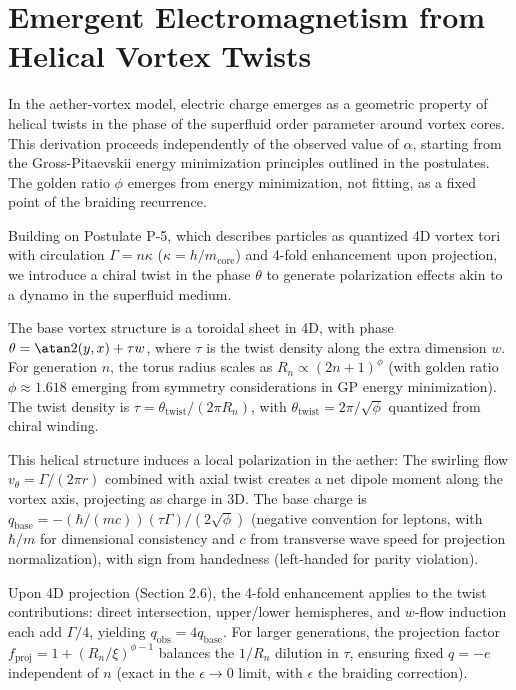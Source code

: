 \section{Emergent Electromagnetism from Helical Vortex Twists}

In the aether-vortex model, electric charge emerges as a geometric property of helical twists in the phase of the superfluid order parameter around vortex cores. This derivation proceeds independently of the observed value of $\alpha$, starting from the Gross-Pitaevskii energy minimization principles outlined in the postulates. The golden ratio $\phi$ emerges from energy minimization, not fitting, as a fixed point of the braiding recurrence.

Building on Postulate P-5, which describes particles as quantized 4D vortex tori with circulation $\Gamma = n \kappa$ ($\kappa = h / m_{\text{core}}$) and 4-fold enhancement upon projection, we introduce a chiral twist in the phase $\theta$ to generate polarization effects akin to a dynamo in the superfluid medium.

The base vortex structure is a toroidal sheet in 4D, with phase $\theta = \atan2(y, x) + \tau w$, where $\tau$ is the twist density along the extra dimension $w$. For generation $n$, the torus radius scales as $R_n \propto (2n+1)^\phi$ (with golden ratio $\phi \approx 1.618$ emerging from symmetry considerations in GP energy minimization). The twist density is $\tau = \theta_{\text{twist}} / (2\pi R_n)$, with $\theta_{\text{twist}} = 2\pi / \sqrt{\phi}$ quantized from chiral winding.

This helical structure induces a local polarization in the aether: The swirling flow $v_{\theta} = \Gamma / (2\pi r)$ combined with axial twist creates a net dipole moment along the vortex axis, projecting as charge in 3D. The base charge is $q_{\text{base}} = - (\hbar / (m c)) (\tau \Gamma) / (2 \sqrt{\phi})$ (negative convention for leptons, with $\hbar / m$ for dimensional consistency and $c$ from transverse wave speed for projection normalization), with sign from handedness (left-handed for parity violation).

Upon 4D projection (Section 2.6), the 4-fold enhancement applies to the twist contributions: direct intersection, upper/lower hemispheres, and $w$-flow induction each add $\Gamma/4$, yielding $q_{\text{obs}} = 4 q_{\text{base}}$. For larger generations, the projection factor $f_{\text{proj}} = 1 + (R_n / \xi)^{\phi - 1}$ balances the $1/R_n$ dilution in $\tau$, ensuring fixed $q = -e$ independent of $n$ (exact in the $\epsilon \to 0$ limit, with $\epsilon$ the braiding correction).

